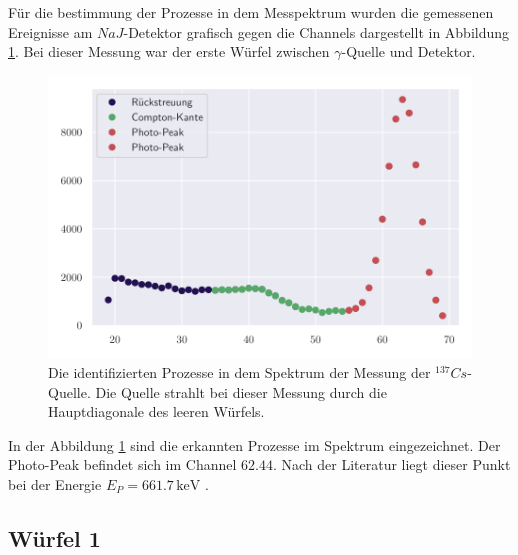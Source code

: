 Für die bestimmung der Prozesse in dem Messpektrum wurden die gemessenen Ereignisse am $NaJ$-Detektor grafisch gegen die Channels dargestellt in Abbildung \ref{fig:leer}. Bei dieser Messung war der erste Würfel zwischen $\gamma$-Quelle und Detektor. 
\begin{figure}[H]
  \centering
  \includegraphics[width = 0.9 \textwidth]{Daten/leerlauf.pdf}
  \caption{Die identifizierten Prozesse in dem Spektrum der Messung der $^{137}Cs$-Quelle. Die Quelle strahlt bei dieser Messung durch die Hauptdiagonale des leeren Würfels. }
  \label{fig:leer}
\end{figure}

In der Abbildung \ref{fig:leer} sind die erkannten Prozesse im Spektrum eingezeichnet. Der Photo-Peak befindet sich im Channel $62.44$. Nach der Literatur liegt dieser Punkt bei der Energie $E_P = 661.7 \,\si{\kilo\electronvolt}$ \cite{CS_Peak}. 
 
\subsection{Würfel 1}

